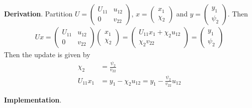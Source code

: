 \documentclass[11pt,a4paper]{article}
\begin{document}
\section{}
{\bf Derivation}.
Partition $U=\left(\begin{array}{c|c} U_{11}& u_{12} \\\hline 0 & v_{22} \end{array}\right)$,
$x = \left( \begin{array}{c} x_1 \\\hline \chi_2 \end{array} \right)$ and 
$y = \left( \begin{array}{c} y_1 \\\hline \psi_2 \end{array} \right)$. Then
\begin{align}
    Ux = 
    \left(\begin{array}{c|c} U_{11}& u_{12} \\\hline 0 & v_{22} \end{array}\right)
    \left( \begin{array}{c} x_1 \\\hline \chi_2 \end{array} \right) 
    = 
    \left( \begin{array}{c} U_{11}x_1 + \chi_2 u_{12} \\\hline \chi_2 v_{22} \end{array} \right) 
    =
    \left( \begin{array}{c} y_1 \\\hline \psi_2 \end{array} \right)
\end{align}
Then the update is given by
\begin{align}
    \chi_2 &= \frac{\psi_2}{v_{22}} \\
    U_{11} x_1 &= y_1 - \chi_2 u_{12} = y_1 - \frac{\psi_2}{v_{22}} u_{12}
\end{align}

\noindent
{\bf Implementation}.


\end{document}

